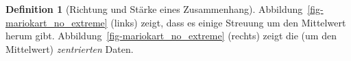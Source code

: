 \documentclass[
  a4paper,
  DIV=11]{scrreprt}
\theoremstyle{definition}
\theoremstyle{definition}
\theoremstyle{definition}
\newtheorem{definition}{Definition}[chapter]
\theoremstyle{remark}
\begin{document}
\begin{definition}[Richtung und Stärke eines
Zusammenhang]
Abbildung~\ref{fig-mariokart_no_extreme} (links) zeigt, dass es einige
Streuung um den Mittelwert herum gibt.
Abbildung~\ref{fig-mariokart_no_extreme} (rechts) zeigt die (um den
Mittelwert) \emph{zentrierten} Daten.

\begin{figure}

\begin{minipage}{0.50\linewidth}



\end{minipage}%
%
\begin{minipage}{0.50\linewidth}

\end{minipage}
\end{figure}
\end{definition}
\end{document}

